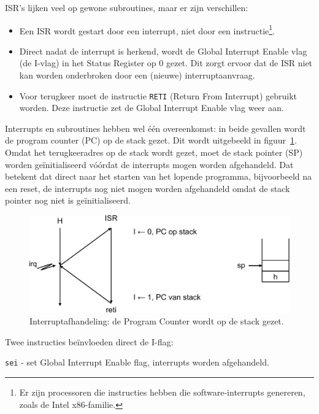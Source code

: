 ISR's lijken veel op gewone subroutines, maar er zijn verschillen:

\begin{itemize}
\item Een ISR wordt gestart door een interrupt, niet door een
instructie\footnote{Er zijn processoren die instructies hebben die
software-interrupts genereren, zoals de Intel x86-familie.}.

\item Direct nadat de interrupt is herkend, wordt de Global Interrupt Enable
vlag (de I-vlag) in het Status Register op 0 gezet. Dit zorgt ervoor dat de
ISR niet kan worden onderbroken door een (nieuwe) interruptaanvraag.

\item Voor terugkeer moet de instructie \lstinline|RETI| (Return From
Interrupt) gebruikt worden. Deze instructie zet de Global Interrupt Enable
vlag weer aan.
\end{itemize}

Interrupts en subroutines hebben wel \'e\'en overeenkomst: in beide gevallen
wordt de program counter (PC) op de stack gezet. Dit wordt uitgebeeld in
figuur~\ref{fig:intinterruptdispatchwithstackandiflag}. Omdat het
terugkeeradres op de stack wordt gezet, moet de stack pointer (SP) worden
ge\"initialiseerd v\'o\'ordat de interrupts mogen worden afgehandeld. Dat
betekent dat direct naar het starten van het lopende programma, bijvoorbeeld
na een reset, de interrupts nog niet mogen worden afgehandeld omdat de
stack pointer nog niet is ge\"initialiseerd.

\begin{figure}[!ht]
\centering
\includegraphics[scale=\figscale]{images/intinterruptdispatchwithstackandiflag}
\caption{Interruptafhandeling: de Program Counter wordt op de stack gezet.}
\label{fig:intinterruptdispatchwithstackandiflag}
\end{figure}

Twee instructies be\"invloeden direct de I-flag:

\qquad \lstinline|sei| - set Global Interrupt Enable flag, interrupts worden afgehandeld.

